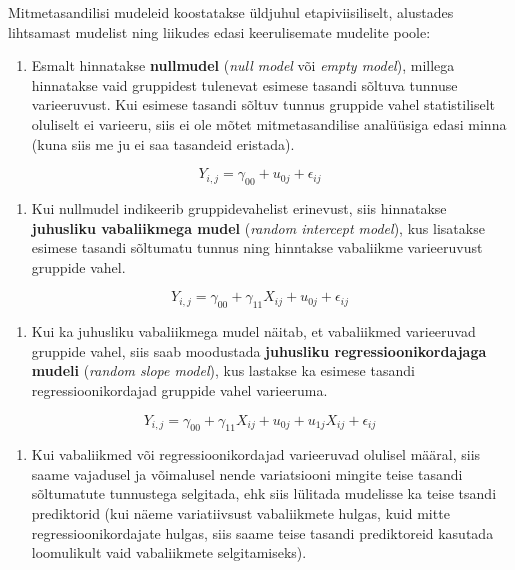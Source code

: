 \documentclass[
]{book}
\providecommand{\tightlist}{%
  \setlength{\itemsep}{0pt}\setlength{\parskip}{0pt}}
\begin{document}
Mitmetasandilisi mudeleid koostatakse üldjuhul etapiviisiliselt, alustades lihtsamast mudelist ning liikudes edasi keerulisemate mudelite poole:

\begin{enumerate}
\def\labelenumi{\arabic{enumi}.}
\tightlist
\item
  Esmalt hinnatakse \textbf{nullmudel} (\emph{null model} või \emph{empty model}), millega hinnatakse vaid gruppidest tulenevat esimese tasandi sõltuva tunnuse varieeruvust. Kui esimese tasandi sõltuv tunnus gruppide vahel statistiliselt oluliselt ei varieeru, siis ei ole mõtet mitmetasandilise analüüsiga edasi minna (kuna siis me ju ei saa tasandeid eristada).
\end{enumerate}

\[Y_{i,j} = \gamma_{00} + u_{0j} + \epsilon_{ij}\]

\begin{enumerate}
\def\labelenumi{\arabic{enumi}.}
\setcounter{enumi}{1}
\tightlist
\item
  Kui nullmudel indikeerib gruppidevahelist erinevust, siis hinnatakse \textbf{juhusliku vabaliikmega mudel} (\emph{random intercept model}), kus lisatakse esimese tasandi sõltumatu tunnus ning hinntakse vabaliikme varieeruvust gruppide vahel.
\end{enumerate}

\[Y_{i,j} = \gamma_{00}+ \gamma_{11}X_{ij} + u_{0j} + \epsilon_{ij}\]

\begin{enumerate}
\def\labelenumi{\arabic{enumi}.}
\setcounter{enumi}{2}
\tightlist
\item
  Kui ka juhusliku vabaliikmega mudel näitab, et vabaliikmed varieeruvad gruppide vahel, siis saab moodustada \textbf{juhusliku regressioonikordajaga mudeli} (\emph{random slope model}), kus lastakse ka esimese tasandi regressioonikordajad gruppide vahel varieeruma.
\end{enumerate}

\[Y_{i,j} = \gamma_{00}+ \gamma_{11}X_{ij} + u_{0j} + u_{1j}X_{ij} + \epsilon_{ij}\]

\begin{enumerate}
\def\labelenumi{\arabic{enumi}.}
\setcounter{enumi}{3}
\tightlist
\item
  Kui vabaliikmed või regressioonikordajad varieeruvad olulisel määral, siis saame vajadusel ja võimalusel nende variatsiooni mingite teise tasandi sõltumatute tunnustega selgitada, ehk siis lülitada mudelisse ka teise tsandi prediktorid (kui näeme variatiivsust vabaliikmete hulgas, kuid mitte regressioonikordajate hulgas, siis saame teise tasandi prediktoreid kasutada loomulikult vaid vabaliikmete selgitamiseks).
\end{enumerate}
\end{document}
